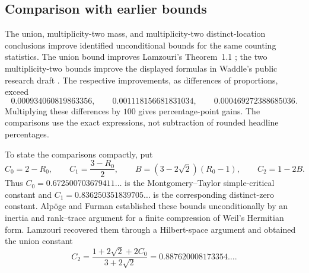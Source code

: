 \subsection{Comparison with earlier bounds}
\label{subsec:literaturecomparison}

The union, multiplicity-two mass, and multiplicity-two distinct-location
conclusions improve identified unconditional bounds for the same counting
statistics. The union bound improves Lamzouri's
Theorem~1.1 \cite{Lamzouri}; the two multiplicity-two bounds improve
the displayed formulas in Waddle's public research draft \cite{Waddle}.
The respective improvements, as differences of proportions, exceed
\[
 0.000934060819863356,\qquad
 0.001118156681831034,\qquad
 0.000469272388685036.
\]
Multiplying these differences by $100$ gives percentage-point gains.
The comparisons use the exact expressions, not subtraction of rounded
headline percentages.

To state the comparisons compactly, put
\begin{equation}\label{eq:literatureconstants}
 C_0=2-R_0,\qquad C_1=\frac{3-R_0}{2},\qquad
 B=(3-2\sqrt2)(R_0-1),\qquad C_2=1-2B.
\end{equation}
Thus $C_0=0.672500703679411\ldots$ is the Montgomery--Taylor
simple-critical constant and $C_1=0.836250351839705\ldots$ is the
corresponding distinct-zero constant. Alp\"oge and Furman
\cite[Theorem A]{AF} established these bounds unconditionally by an
inertia and rank--trace argument for a finite compression of Weil's
Hermitian form. Lamzouri \cite{Lamzouri} recovered them through a
Hilbert-space argument and obtained the union constant
\[
 C_2=\frac{1+2\sqrt2+2C_0}{3+2\sqrt2}
       =0.887620008173354\ldots.
\]

